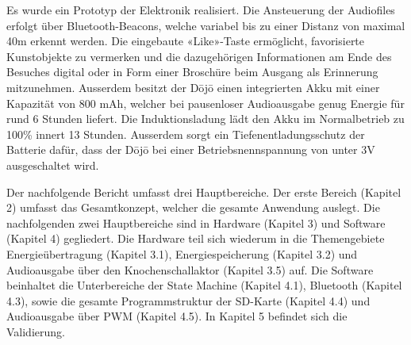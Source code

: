 Es wurde ein Prototyp der Elektronik realisiert. Die Ansteuerung der Audiofiles erfolgt über Bluetooth-Beacons, welche variabel bis zu einer Distanz von maximal 40m erkennt werden. Die eingebaute «Like»-Taste ermöglicht, favorisierte Kunstobjekte zu vermerken und die dazugehörigen Informationen am Ende des Besuches digital oder in Form einer Broschüre beim Ausgang als Erinnerung mitzunehmen. Ausserdem besitzt der Dōjō einen integrierten Akku mit einer Kapazität von 800 mAh, welcher bei pausenloser Audioausgabe genug Energie für rund 6 Stunden liefert. Die Induktionsladung lädt den Akku im Normalbetrieb zu 100\% innert 13 Stunden. Ausserdem sorgt ein Tiefenentladungsschutz der Batterie dafür, dass der Dōjō bei einer Betriebsnennspannung von unter 3V ausgeschaltet wird.
 
Der nachfolgende Bericht umfasst drei Hauptbereiche. Der erste Bereich (Kapitel 2) umfasst das Gesamtkonzept, welcher die gesamte Anwendung auslegt. Die nachfolgenden zwei Hauptbereiche sind in Hardware (Kapitel 3) und Software (Kapitel 4) gegliedert. Die Hardware teil sich wiederum in die Themengebiete Energieübertragung (Kapitel 3.1), Energiespeicherung (Kapitel 3.2) und Audioausgabe über den Knochenschallaktor (Kapitel 3.5) auf. Die Software beinhaltet die Unterbereiche der State Machine (Kapitel 4.1), Bluetooth (Kapitel 4.3), sowie die gesamte Programmstruktur der SD-Karte (Kapitel 4.4) und Audioausgabe über PWM (Kapitel 4.5). In Kapitel 5 befindet sich die Validierung.